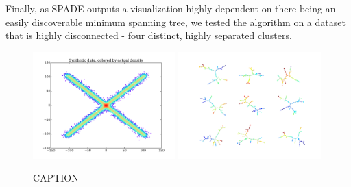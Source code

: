 \documentclass{article}
\begin{document}
Finally, as SPADE outputs a visualization highly dependent on there being an easily discoverable minimum spanning tree, we tested the algorithm on a dataset that is highly disconnected - four distinct, highly separated clusters.

\begin{figure}
\begin{center}
\includegraphics[width = 0.49\textwidth]{figures/synthetic_data.pdf}
\includegraphics[width = 0.49\textwidth]{figures/spade_multiview.pdf}
\caption{CAPTION}
\label{fig:spade_analysis}
\end{center}
\end{figure}



\end{document}
